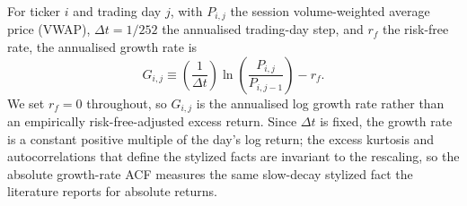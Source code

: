 For ticker $i$ and trading day $j$, with $P_{i,j}$ the session volume-weighted average price (VWAP), $\Delta t = 1/252$ the annualised trading-day step, and $r_f$ the risk-free rate, the annualised growth rate is
\begin{equation}
    G_{i,j} \equiv \left(\frac{1}{\Delta t}\right) \ln\!\left(\frac{P_{i,j}}{P_{i,j-1}}\right) - r_f.
    \label{eq:growth_rate}
\end{equation}
We set $r_f = 0$ throughout, so $G_{i,j}$ is the annualised log growth rate rather than an empirically risk-free-adjusted excess return. Since $\Delta t$ is fixed, the growth rate is a constant positive multiple of the day's log return; the excess kurtosis and autocorrelations that define the stylized facts are invariant to the rescaling, so the absolute growth-rate ACF measures the same slow-decay stylized fact the literature reports for absolute returns.

